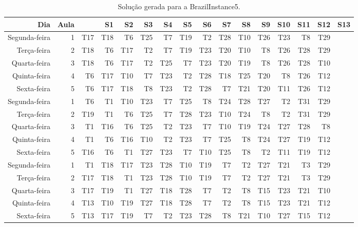 \begin{table}[!htb]
    \centering
    \caption[Solução gerada para a BrazilInstance5]{Solução gerada para a BrazilInstance5.
    \label{tab:brazilinstance5_solucao}}
    \begin{tabular}{rrrrrrrrrrrrrrrr}
        \toprule
           Dia & Aula && S1 & S2 & S3 & S4 & S5 & S6 & S7 & S8 & S9 & S10 & S11 & S12 & S13 \\
        \midrule
        Segunda-feira & 1 & T17 & T18 & T6 & T25 & T7 & T19 & T2 & T28 & T10 & T26 & T23 & T8 & T29 \\
        Terça-feira & 2 & T18 & T6 & T17 & T2 & T7 & T19 & T23 & T20 & T10 & T8 & T26 & T28 & T29 \\
        Quarta-feira & 3 & T18 & T6 & T17 & T2 & T25 & T7 & T23 & T20 & T19 & T8 & T26 & T28 & T10 \\
        Quinta-feira & 4 & T6 & T17 & T10 & T7 & T23 & T2 & T28 & T18 & T25 & T20 & T8 & T26 & T12 \\
        Sexta-feira & 5 & T6 & T17 & T18 & T8 & T23 & T2 & T28 & T7 & T21 & T20 & T11 & T26 & T12 \\
        \midrule
        Segunda-feira & 1 & T6 & T1 & T10 & T23 & T7 & T25 & T8 & T24 & T28 & T27 & T2 & T31 & T29 \\
        Terça-feira & 2 & T19 & T1 & T6 & T25 & T7 & T28 & T23 & T10 & T24 & T8 & T2 & T31 & T29 \\
        Quarta-feira & 3 & T1 & T16 & T6 & T25 & T2 & T23 & T7 & T10 & T19 & T24 & T27 & T28 & T8 \\
        Quinta-feira & 4 & T1 & T6 & T16 & T10 & T2 & T23 & T7 & T25 & T8 & T24 & T27 & T19 & T12 \\
        Sexta-feira & 5 & T16 & T6 & T1 & T27 & T23 & T7 & T10 & T25 & T8 & T2 & T11 & T19 & T12 \\
        \midrule
        Segunda-feira & 1 & T1 & T18 & T17 & T23 & T28 & T10 & T19 & T7 & T2 & T27 & T21 & T3 & T29 \\
        Terça-feira & 2 & T17 & T18 & T1 & T23 & T28 & T10 & T19 & T7 & T2 & T27 & T21 & T3 & T29 \\
        Quarta-feira & 3 & T17 & T19 & T1 & T27 & T18 & T28 & T7 & T2 & T8 & T15 & T23 & T21 & T10 \\
        Quinta-feira & 4 & T13 & T10 & T19 & T27 & T18 & T28 & T7 & T2 & T8 & T15 & T23 & T21 & T12 \\
        Sexta-feira & 5 & T13 & T17 & T19 & T7 & T2 & T23 & T28 & T8 & T21 & T10 & T27 & T15 & T12 \\

\end{tabular}
\end{table}
